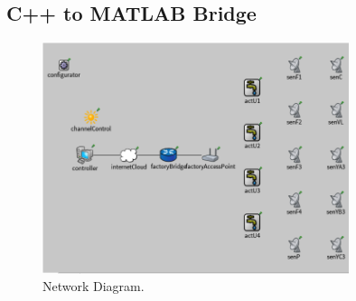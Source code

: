 \subsection{C++ to MATLAB Bridge}

\begin{figure}
        \centering
		\includegraphics[width=0.8\textwidth]{figs/network.png}
        \caption{Network Diagram.}
        \label{fig:system}        
\end{figure}
